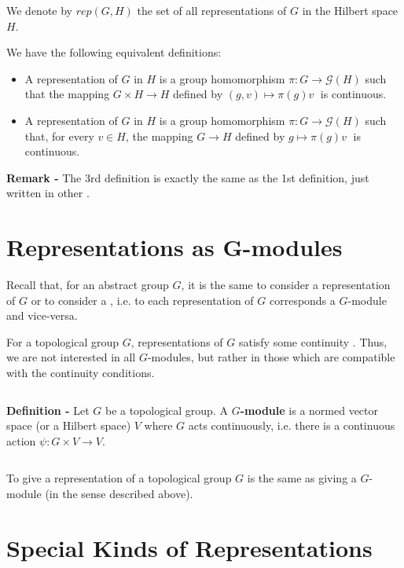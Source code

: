 \documentclass[12pt]{article}
\begin{document}
$\,$

We denote by $rep(G, H)$ the set of all representations of $G$ in the Hilbert space $H$.

We have the following equivalent definitions:

\begin{itemize}
\item A representation of $G$ in $H$ is a group homomorphism $\pi:G \longrightarrow \mathcal{G}(H)$ such that the mapping $G \times H \longrightarrow H$ defined by
$(g,v) \mapsto \pi(g)v\;$
is continuous.
\end{itemize}
\begin{itemize}
\item A representation of $G$ in $H$ is a group homomorphism $\pi:G \longrightarrow \mathcal{G}(H)$ such that, for every $v \in H$, the mapping $G \longrightarrow H$ defined by
$g \mapsto \pi(g)v\;$
is continuous.
\end{itemize}

{\bf Remark -} The 3rd definition is exactly the same as the 1st definition, just written in other .

\section{Representations as G-modules}

Recall that, for an abstract group $G$, it is the same to consider a representation of $G$ or to consider a , i.e. to each representation of $G$ corresponds a $G$-module and vice-versa.

For a topological group $G$, representations of $G$ satisfy some continuity . Thus, we are not interested in all $G$-modules, but rather in those which are compatible with the continuity conditions.

$\,$

{\bf Definition -} Let $G$ be a topological group. A {\bf $G$-module} is a normed vector space (or a Hilbert space) $V$ where $G$ acts continuously, i.e. there is a continuous action $\psi :G \times V \longrightarrow V$.

$\,$

To give a representation of a topological group $G$ is the same as giving a $G$-module (in the sense described above).

\section{Special Kinds of Representations}
\end{document}
